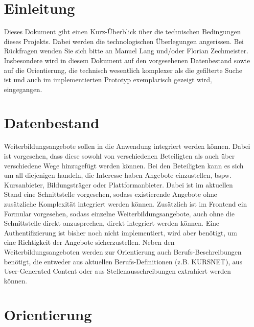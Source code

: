 \documentclass[10pt]{article}
\begin{document}
\maketitle

\section{Einleitung}

Dieses Dokument gibt einen Kurz-Überblick über die technischen Bedingungen
dieses Projekts. Dabei werden die technologischen Überlegungen angerissen. Bei
Rückfragen wenden Sie sich bitte an Manuel Lang und/oder Florian Zechmeister.
Insbesondere wird in diesem Dokument auf den vorgesehenen Datenbestand sowie
auf die Orientierung, die technisch wesentlich komplexer als die gefilterte 
Suche ist und auch im implementierten Prototyp exemplarisch gezeigt
wird, eingegangen.

\section{Datenbestand}

Weiterbildungsangebote sollen in die Anwendung integriert werden können. Dabei
ist vorgesehen, dass diese sowohl von verschiedenen Beteiligten als auch über 
verschiedene Wege hinzugefügt werden können. Bei den Beteiligten kann es sich 
um all diejenigen handeln, die Interesse haben Angebote einzustellen, bspw.
Kursanbieter, Bildungsträger oder Plattformanbieter. Dabei ist im aktuellen
Stand eine Schnittstelle vorgesehen, sodass existierende Angebote ohne
zusätzliche Komplexität integriert werden können. Zusätzlich ist im Frontend ein
Formular vorgesehen, sodass einzelne Weiterbildungsangebote, auch ohne die
Schnittstelle direkt anzusprechen, direkt integriert werden können. Eine
Authentifizierung ist bisher noch nicht implementiert, wird aber benötigt, 
um eine Richtigkeit der Angebote sicherzustellen. Neben den
Weiterbildungsangeboten werden zur Orientierung auch Berufs-Beschreibungen
benötigt, die entweder aus aktuellen Berufs-Definitionen (z.B. KURSNET), aus
User-Generated Content oder aus Stellenausschreibungen extrahiert werden können.

\section{Orientierung}
\end{document}
